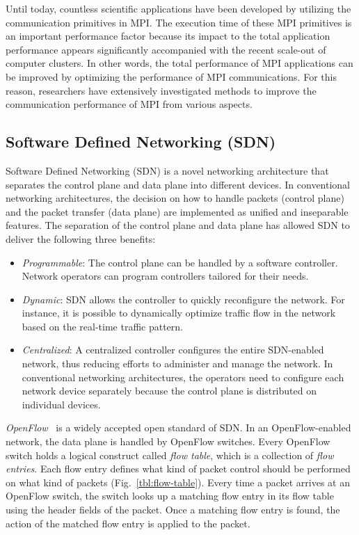 Until today, countless scientific applications have been developed by
utilizing the communication primitives in MPI\@. The execution time of
these MPI primitives is an important performance factor because its
impact to the total application performance appears significantly
accompanied with the recent scale-out of computer clusters. In other
words, the total performance of MPI applications can be improved by
optimizing the performance of MPI communications. For this reason,
researchers have extensively investigated methods to improve the
communication performance of MPI from various aspects.

\hypertarget{software-defined-networking-sdn}{%
\subsection{Software Defined Networking
(SDN)}\label{software-defined-networking-sdn}}

Software Defined Networking (SDN) is a novel networking architecture
that separates the control plane and data plane into different devices.
In conventional networking architectures, the decision on how to handle
packets (control plane) and the packet transfer (data plane) are
implemented as unified and inseparable features. The separation of the
control plane and data plane has allowed SDN to deliver the following
three benefits:

\begin{itemize}
\item
  \emph{Programmable}: The control plane can be handled by a software
  controller. Network operators can program controllers tailored for
  their needs.
\item
  \emph{Dynamic}: SDN allows the controller to quickly reconfigure the
  network. For instance, it is possible to dynamically optimize traffic
  flow in the network based on the real-time traffic pattern.
\item
  \emph{Centralized}: A centralized controller configures the entire
  SDN-enabled network, thus reducing efforts to administer and manage
  the network. In conventional networking architectures, the operators
  need to configure each network device separately because the control
  plane is distributed on individual devices.
\end{itemize}

\emph{OpenFlow}~\autocite{McKeown2008} is a widely accepted open
standard of SDN\@. In an OpenFlow-enabled network, the data plane is
handled by OpenFlow switches. Every OpenFlow switch holds a logical
construct called \emph{flow table}, which is a collection of \emph{flow
entries}. Each flow entry defines what kind of packet control should be
performed on what kind of packets (Fig.~\ref{tbl:flow-table}). Every
time a packet arrives at an OpenFlow switch, the switch looks up a
matching flow entry in its flow table using the header fields of the
packet. Once a matching flow entry is found, the action of the matched
flow entry is applied to the packet.

